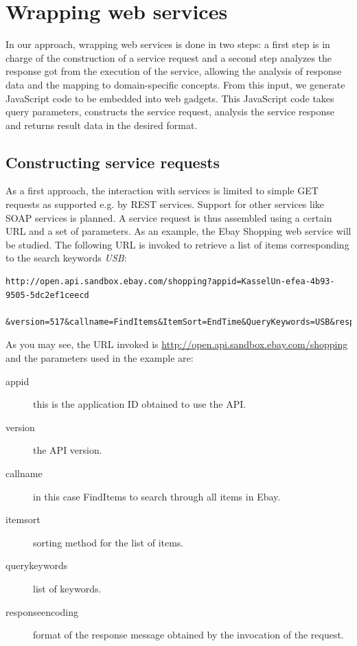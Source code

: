 
\section{Wrapping web services}
\label{sec:wrapping_web_services}

In our approach, wrapping web services is done in two steps: a first step is in charge of the construction of a service request and a second step analyzes the response got from the execution of the service, allowing the analysis of response data and the mapping to domain-specific concepts. From this input, we generate JavaScript code to be embedded into web gadgets. This JavaScript code takes query parameters, constructs the service request, analysis the service response and returns result data in the desired format. 

\subsection{Constructing service requests} %
\label{sub:constructing_service_requests}

As a first approach, the interaction with services is limited to simple GET requests as supported e.g. by REST services. Support for other services like SOAP services is planned. A service request is thus assembled using a certain URL and a set of parameters. As an example, the Ebay Shopping web service will be studied. The following URL is invoked to retrieve a list of items corresponding to the search keywords \emph{USB}:

\begin{listing}
\begin{verbatim}
http://open.api.sandbox.ebay.com/shopping?appid=KasselUn-efea-4b93-9505-5dc2ef1ceecd
  &version=517&callname=FindItems&ItemSort=EndTime&QueryKeywords=USB&responseencoding=XML
\end{verbatim}
\end{listing}

As you may see, the URL invoked is \url{http://open.api.sandbox.ebay.com/shopping} and the parameters used in the example are:
\begin{description}
	\item[appid] this is the application ID obtained to use the API.
	\item[version] the API version.
	\item[callname] in this case FindItems to search through all items in Ebay.
	\item[itemsort] sorting method for the list of items.
	\item[querykeywords] list of keywords.
	\item[responseencoding] format of the response message obtained by the invocation of the request.
\end{description}

